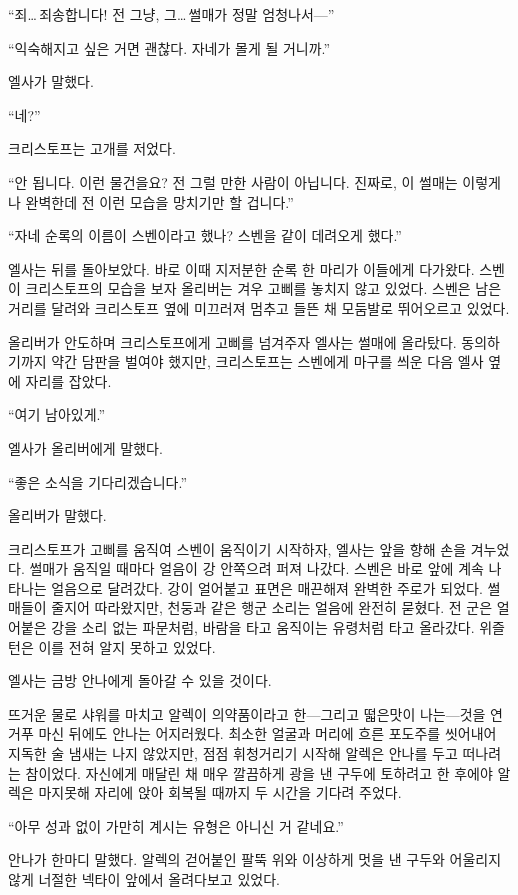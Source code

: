 ``죄\ldots\,죄송합니다! 전 그냥, 그\ldots\,썰매가 정말 엄청나서—''

``익숙해지고 싶은 거면 괜찮다. 자네가 몰게 될 거니까.''

엘사가 말했다.

``네?''

크리스토프는 고개를 저었다.

``안 됩니다. 이런 물건을요? 전 그럴 만한 사람이 아닙니다. 진짜로, 이 썰매는 이렇게나 완벽한데 전 이런 모습을 망치기만 할 겁니다.''

``자네 순록의 이름이 스벤이라고 했나? 스벤을 같이 데려오게 했다.''

엘사는 뒤를 돌아보았다. 바로 이때 지저분한 순록 한 마리가 이들에게 다가왔다. 스벤이 크리스토프의 모습을 보자 올리버는 겨우 고삐를 놓치지 않고 있었다. 스벤은 남은 거리를 달려와 크리스토프 옆에 미끄러져 멈추고 들뜬 채 모둠발로 뛰어오르고 있었다.

올리버가 안도하며 크리스토프에게 고삐를 넘겨주자 엘사는 썰매에 올라탔다. 동의하기까지 약간 담판을 벌여야 했지만, 크리스토프는 스벤에게 마구를 씌운 다음 엘사 옆에 자리를 잡았다.

``여기 남아있게.''

엘사가 올리버에게 말했다.

``좋은 소식을 기다리겠습니다.''

올리버가 말했다.

크리스토프가 고삐를 움직여 스벤이 움직이기 시작하자, 엘사는 앞을 향해 손을 겨누었다. 썰매가 움직일 때마다 얼음이 강 안쪽으려 퍼져 나갔다. 스벤은 바로 앞에 계속 나타나는 얼음으로 달려갔다. 강이 얼어붙고 표면은 매끈해져 완벽한 주로가 되었다. 썰매들이 줄지어 따라왔지만, 천둥과 같은 행군 소리는 얼음에 완전히 묻혔다. 전 군은 얼어붙은 강을 소리 없는 파문처럼, 바람을 타고 움직이는 유령처럼 타고 올라갔다. 위즐턴은 이를 전혀 알지 못하고 있었다.

엘사는 금방 안나에게 돌아갈 수 있을 것이다.

\textbreak

뜨거운 물로 샤워를 마치고 알렉이 의약품이라고 한—그리고 떫은맛이 나는—것을 연거푸 마신 뒤에도 안나는 어지러웠다. 최소한 얼굴과 머리에 흐른 포도주를 씻어내어 지독한 술 냄새는 나지 않았지만, 점점 휘청거리기 시작해 알렉은 안나를 두고 떠나려는 참이었다. 자신에게 매달린 채 매우 깔끔하게 광을 낸 구두에 토하려고 한 후에야 알렉은 마지못해 자리에 앉아 회복될 때까지 두 시간을 기다려 주었다.

``아무 성과 없이 가만히 계시는 유형은 아니신 거 같네요.''

안나가 한마디 말했다. 알렉의 걷어붙인 팔뚝 위와 이상하게 멋을 낸 구두와 어울리지 않게 너절한 넥타이 앞에서 올려다보고 있었다.

